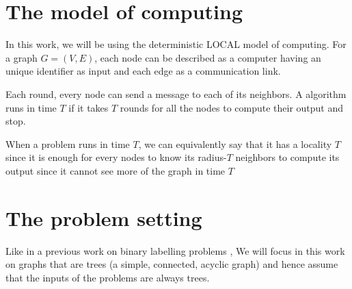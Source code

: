 \section{The model of computing}
In this work, we will be using the deterministic LOCAL model \cite{locality,locality2} of computing. For a graph $G=(V,E)$, each node can be described as a computer having an unique identifier as input and each edge as a communication link.

Each round, every node can send a message to each of its neighbors. A algorithm runs in time $T$ if it takes $T$ rounds for all the nodes to compute their output and stop.

When a problem runs in time $T$, we can equivalently say that it has a locality $T$ since it is enough for every nodes to know its radius-$T$ neighbors to compute its output since it cannot see more of the graph in time $T$
\section{The problem setting}
Like in a previous work on binary labelling problems \cite{1}, We will focus in this work on graphs that are trees (a simple, connected, acyclic graph) and hence assume that the inputs of the problems are always trees.
